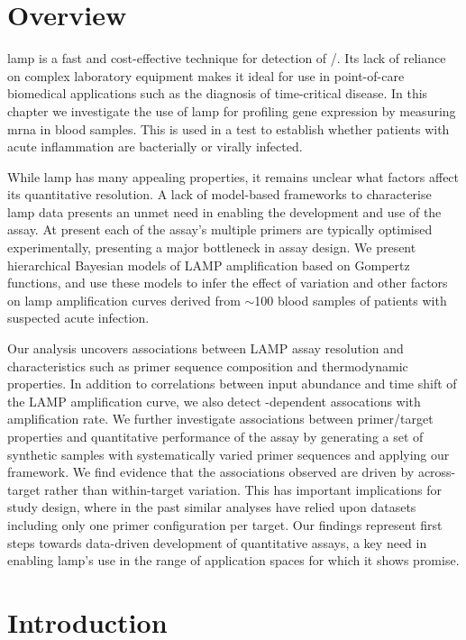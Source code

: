 \documentclass[../thesis.tex]{subfiles}
\begin{document}
\section*{Overview}
\Gls{lamp} is a fast and cost-effective technique for detection of /. Its lack of reliance on complex laboratory equipment makes it ideal for use in point-of-care biomedical applications such as the diagnosis of time-critical disease. In this chapter we investigate the use of \gls{lamp} for profiling gene expression by measuring \gls{mrna} in blood samples. This is used in a test to establish whether patients with acute inflammation are bacterially or virally infected.  

While \gls{lamp} has many appealing properties, it remains unclear what factors affect its quantitative resolution. A lack of model-based frameworks to characterise \gls{lamp} data presents an unmet need in enabling the development and use of the assay. At present each of the assay's multiple primers are typically optimised experimentally, presenting a major bottleneck in assay design.  
We present hierarchical Bayesian models of LAMP amplification based on Gompertz functions, and use these models to infer the effect of  variation and other factors on \gls{lamp} amplification curves derived from $\sim$100 blood samples of patients with suspected acute infection. 

Our analysis uncovers associations between LAMP assay resolution and characteristics such as primer sequence composition and thermodynamic properties. In addition to correlations between  input abundance and time shift of the LAMP amplification curve, we also detect -dependent assocations with amplification rate.  We further investigate associations between primer/target properties and quantitative performance of the assay by generating a set of synthetic  samples with systematically varied primer sequences and applying our framework. We find evidence that the associations observed are driven by across-target rather than within-target variation. This has important implications for study design, where in the past similar analyses have relied upon datasets including only one primer configuration per target. Our findings represent first steps towards data-driven development of quantitative assays, a key need in enabling \gls{lamp}'s use in the range of application spaces for which it shows promise.


\section{Introduction \label{sec:intro}}
\end{document}
